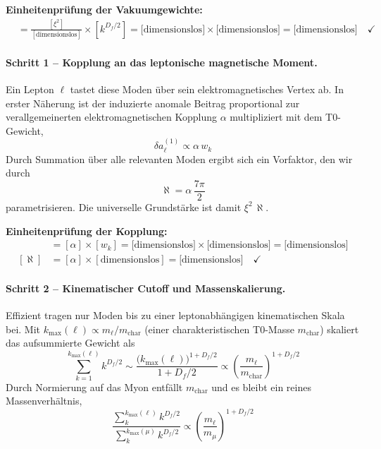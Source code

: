 \documentclass[12pt,a4paper]{article}
\newcommand{\xipar}{\xi}
\newcommand{\alphagem}{\alpha}
\newcommand{\mchar}{m_{\text{char}}}
\theoremstyle{remark}
\begin{document}
\begin{units}
	\textbf{Einheitenprüfung der Vakuumgewichte:}
	\begin{align}
		[w_k] &= \frac{[\xi^2]}{[\text{dimensionslos}]} \times [k^{D_f/2}] = \text{[dimensionslos]} \times \text{[dimensionslos]} = \text{[dimensionslos]} \quad \checkmark
	\end{align}
\end{units}

\paragraph{Schritt 1 -- Kopplung an das leptonische magnetische Moment.}
Ein Lepton $\ell$ tastet diese Moden über sein elektromagnetisches Vertex ab. In erster Näherung ist der induzierte anomale Beitrag proportional zur verallgemeinerten elektromagnetischen Kopplung $\alphagem$ multipliziert mit dem T0-Gewicht,
\begin{equation}
	\delta a_\ell^{(1)} \propto \alphagem\, w_k
\end{equation}
Durch Summation über alle relevanten Moden ergibt sich ein Vorfaktor, den wir durch
\begin{equation}
	\aleph = \alphagem \,\frac{7\pi}{2}
\end{equation}
parametrisieren. Die universelle Grundstärke ist damit $\xipar^2\,\aleph$.

\begin{units}
	\textbf{Einheitenprüfung der Kopplung:}
	\begin{align}
		[\delta a_\ell^{(1)}] &= [\alphagem] \times [w_k] = \text{[dimensionslos]} \times \text{[dimensionslos]} = \text{[dimensionslos]} \\
		[\aleph] &= [\alphagem] \times [\text{dimensionslos}] = \text{[dimensionslos]} \quad \checkmark
	\end{align}
\end{units}

\paragraph{Schritt 2 -- Kinematischer Cutoff und Massenskalierung.}
Effizient tragen nur Moden bis zu einer leptonabhängigen kinematischen Skala bei. Mit $k_{\max}(\ell)\propto m_\ell/\mchar$ (einer charakteristischen T0-Masse $\mchar$) skaliert das aufsummierte Gewicht als
\begin{equation}
	\sum_{k=1}^{k_{\max}(\ell)} k^{D_f/2} \sim \frac{ \big(k_{\max}(\ell)\big)^{1+D_f/2} }{1+D_f/2} \propto \left(\frac{m_\ell}{\mchar}\right)^{1+D_f/2}
\end{equation}
Durch Normierung auf das Myon entfällt $\mchar$ und es bleibt ein reines Massenverhältnis,
\begin{equation}
	\frac{\sum_k^{k_{\max}(\ell)} k^{D_f/2}}{\sum_k^{k_{\max}(\mu)} k^{D_f/2}} \propto \left(\frac{m_\ell}{m_\mu}\right)^{1+D_f/2}
\end{equation}
\end{document}
